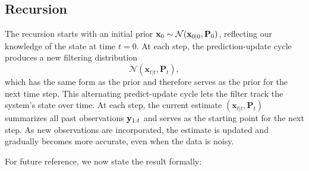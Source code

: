 
\subsection*{Recursion}    
The recursion starts with an initial prior $\mathbf{x}_0 \sim \mathcal{N}(\mathbf{x}_{0|0}, \mathbf{P}_0)$, reflecting our knowledge of the state at time $t = 0$. At each step, the prediction-update cycle produces a new filtering distribution
\[
\mathcal{N}(\mathbf{x}_{t|t}, \mathbf{P}_t),
\]
which has the same form as the prior and therefore serves as the prior for the next time step.
This alternating predict-update cycle lets the filter track the system's state over time. At each step, the current estimate $(\mathbf{x}_{t|t}, \mathbf{P}_t)$ summarizes all past observations $\mathbf{y}_{1:t}$ and serves as the starting point for the next step. As new observations are incorporated, the estimate is updated and gradually becomes more accurate, even when the data is noisy.

For future reference, we now state the result formally:

